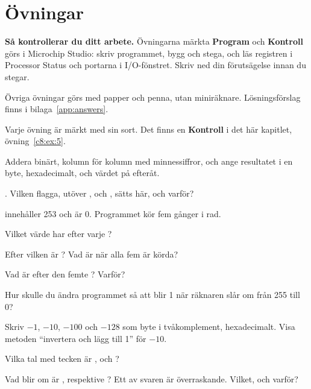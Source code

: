 
\section{Övningar}
\label{c8:sec:exercises}\label{c8:app:d}

\begin{aside}
\textbf{Så kontrollerar du ditt arbete.} Övningarna märkta \textbf{Program} och \textbf{Kontroll}
görs i Microchip Studio: skriv programmet, bygg och stega, och läs registren i Processor Status och
portarna i I/O-fönstret. Skriv ned din förutsägelse innan du stegar.

Övriga övningar görs med papper och penna, utan miniräknare. Lösningsförslag finns i
bilaga~\ref{app:answers}.

Varje övning är märkt med sin sort. Det finns en \textbf{Kontroll} i det här kapitlet,
övning~\ref{c8:ex:5}.
\end{aside}

\label{c8:ex:1}
Addera binärt, kolumn för kolumn med minnessiffror, och ange resultatet i en byte, hexadecimalt,
och värdet på  efteråt.
\begin{parts}
  \item {}
  \item {}
  \item {}. Vilken flagga, utöver ,  och , sätts här, och
    varför?
\end{parts}

\label{c8:ex:2}
 innehåller 253 och  är 0. Programmet kör  fem gånger i rad.
\begin{parts}
  \item Vilket värde har  efter varje ?
  \item Efter vilken  är ? Vad är  när alla fem är körda?
  \item Vad är  efter den femte ? Varför?
  \item Hur skulle du ändra programmet så att  blir 1 när räknaren slår om från 255 till 0?
\end{parts}

\label{c8:ex:3}
\begin{parts}
  \item Skriv $-1$, $-10$, $-100$ och $-128$ som byte i tvåkomplement, hexadecimalt. Visa metoden
    \enquote{invertera och lägg till 1} för $-10$.
  \item Vilka tal med tecken är ,  och ?
  \item Vad blir  om  är ,  respektive ?
    Ett av svaren är överraskande. Vilket, och varför?
\end{parts}

